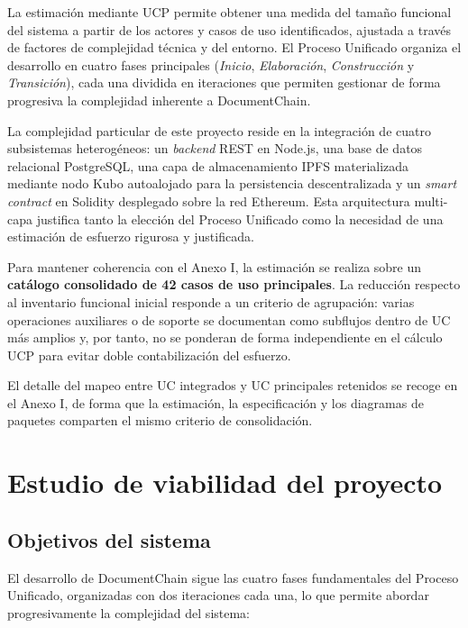 \documentclass[11pt, a4paper]{article}
\begin{document}
La estimación mediante UCP permite obtener una medida del tamaño funcional del sistema a partir de los actores y casos de uso identificados, ajustada a través de factores de complejidad técnica y del entorno. El Proceso Unificado organiza el desarrollo en cuatro fases principales (\textit{Inicio}, \textit{Elaboración}, \textit{Construcción} y \textit{Transición}), cada una dividida en iteraciones que permiten gestionar de forma progresiva la complejidad inherente a DocumentChain.

La complejidad particular de este proyecto reside en la integración de cuatro subsistemas heterogéneos: un \textit{backend} REST en Node.js, una base de datos relacional PostgreSQL, una capa de almacenamiento IPFS materializada mediante nodo Kubo autoalojado para la persistencia descentralizada y un \textit{smart contract} en Solidity desplegado sobre la red Ethereum. Esta arquitectura multi-capa justifica tanto la elección del Proceso Unificado como la necesidad de una estimación de esfuerzo rigurosa y justificada.

Para mantener coherencia con el Anexo I, la estimación se realiza sobre un \textbf{catálogo consolidado de 42 casos de uso principales}. La reducción respecto al inventario funcional inicial responde a un criterio de agrupación: varias operaciones auxiliares o de soporte se documentan como subflujos dentro de UC más amplios y, por tanto, no se ponderan de forma independiente en el cálculo UCP para evitar doble contabilización del esfuerzo.

El detalle del mapeo entre UC integrados y UC principales retenidos se recoge en el Anexo I, de forma que la estimación, la especificación y los diagramas de paquetes comparten el mismo criterio de consolidación.

\section{Estudio de viabilidad del proyecto}

\subsection{Objetivos del sistema}

El desarrollo de DocumentChain sigue las cuatro fases fundamentales del Proceso Unificado, organizadas con dos iteraciones cada una, lo que permite abordar progresivamente la complejidad del sistema:
\end{document}
